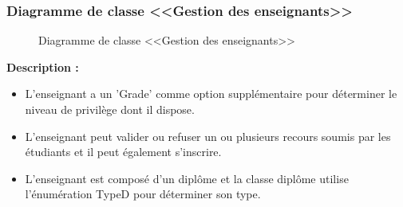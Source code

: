 \documentclass[12pt]{report}
\begin{document}
\newpage

\subsubsection{Diagramme de classe <<Gestion des enseignants>>}

\begin{figure}[h]
\centering
    \centerline{}
    \caption{Diagramme de classe <<Gestion des enseignants>>}
\end{figure}

\vspace{0.3in}

\textbf{Description :}

\begin{itemize}
    \item L'enseignant a un 'Grade' comme option supplémentaire pour déterminer le niveau de privilège dont il dispose.
    \item L'enseignant peut valider ou refuser un ou plusieurs recours soumis par les étudiants et il peut également s'inscrire.
    \item L'enseignant est composé d'un diplôme et la classe diplôme utilise l'énumération TypeD pour déterminer son type.
\end{itemize}
\end{document}

